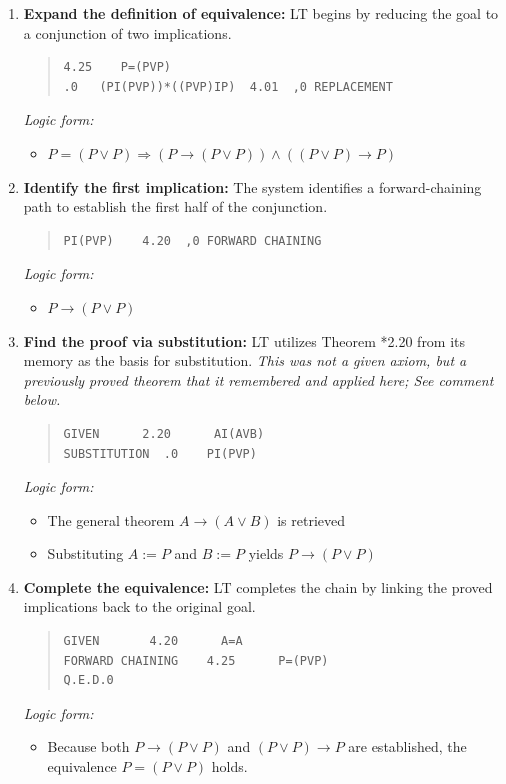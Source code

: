 \documentclass[journal]{IEEEtran}
\begin{document}
\begin{enumerate}

\item \textbf{Expand the definition of equivalence:}
LT begins by reducing the goal to a conjunction of two implications.
\begin{quote}
\begin{verbatim}
4.25    P=(PVP)
.0   (PI(PVP))*((PVP)IP)  4.01  ,0 REPLACEMENT
\end{verbatim}
\end{quote}
\textit{Logic form:}
\begin{itemize}
    \item[] $P = (P \lor P) \Rightarrow (P \rightarrow (P \lor P)) \land ((P \lor P) \rightarrow P)$ 
\end{itemize}

\item \textbf{Identify the first implication:}
The system identifies a forward-chaining path to establish the first half of the conjunction.
\begin{quote}
\begin{verbatim}
PI(PVP)    4.20  ,0 FORWARD CHAINING
\end{verbatim}
\end{quote}
\textit{Logic form:} 
\begin{itemize}
    \item[] $P \rightarrow (P \lor P)$
\end{itemize}

\item \textbf{Find the proof via substitution:}
LT utilizes Theorem *2.20 from its memory as the basis for substitution. \textit{This was not a given axiom, but a previously proved theorem that it remembered and applied here; See comment below.}
\begin{quote}
\begin{verbatim}
GIVEN      2.20      AI(AVB)
SUBSTITUTION  .0    PI(PVP)
\end{verbatim}
\end{quote}
\textit{Logic form:} 
\begin{itemize}
    \item[] The general theorem $A \rightarrow (A \lor B)$ is retrieved
    \item[] Substituting $A := P$ and $B := P$ yields $P \rightarrow (P \lor P)$
\end{itemize}

\item \textbf{Complete the equivalence:}
LT completes the chain by linking the proved implications back to the original goal.
\begin{quote}
\begin{verbatim}
GIVEN       4.20      A=A
FORWARD CHAINING    4.25      P=(PVP)
Q.E.D.0
\end{verbatim}
\end{quote}
\textit{Logic form:} 
\begin{itemize}
    \item[] Because both $P \rightarrow (P \lor P)$ and $(P \lor P) \rightarrow P$ are established, the equivalence $P = (P \lor P)$ holds.
\end{itemize}


\end{enumerate}
\end{document}

